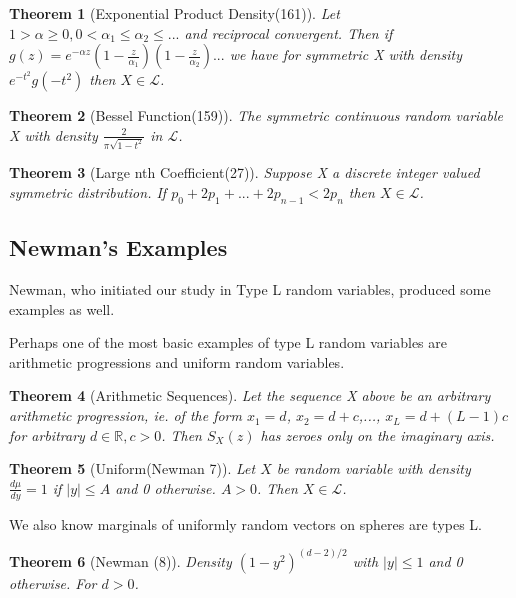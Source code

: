 \documentclass[10pt]{article}
\newcommand{\1}{\textbf{1}}
\newcommand{\R}{\mathbb{R}}
\newcommand{\lL}{\mathcal{L}}
\newtheorem{theorem}{Theorem}
\theoremstyle{remark}
\theoremstyle{definition}
\begin{document}
\begin{theorem}[Exponential Product Density(161)] \label{EXPPDEN}
	Let $1 > \alpha \geq 0, 0 < \alpha_1 \leq \alpha_2 \leq ...$ and reciprocal convergent. Then if $g(z)= e^{-\alpha z} (1-\frac{z}{\alpha_1})(1-\frac{z}{\alpha_2})...$ we have for symmetric X with density $e^{-t^2} g(-t^2)$ then $X \in \lL$.
\end{theorem}

\begin{theorem}[Bessel Function(159)] \label{BF}
	The symmetric continuous random variable X with density $\frac{2}{\pi\sqrt{1-t^2}}$ in $\lL$.
\end{theorem} 

\begin{theorem}[Large nth Coefficient(27)] \label{LNC}
	Suppose X a discrete integer valued symmetric distribution. If $p_0 + 2p_1 +... + 2p_{n-1} < 2p_n$ then $X \in \lL$. 
\end{theorem}


\subsection{Newman's Examples}

Newman, who initiated our study in Type L random variables, produced some examples as well. 

Perhaps one of the most basic examples of type L random variables are arithmetic progressions and uniform random variables.

\begin{theorem}[Arithmetic Sequences] \label{them:AS}
	Let the sequence X above be an arbitrary arithmetic progression, ie. of the form $x_1 = d$, $x_2 = d+c$,..., $x_L = d + (L-1)c$ for arbitrary $d \in \R, c > 0$. Then $S_X(z)$ has zeroes only on the imaginary axis.
\end{theorem}

\begin{theorem}[Uniform(Newman 7)] \label{UNI}
	Let $X$ be random variable with density $\frac{d\mu}{dy} = 1$ if $|y| \leq A$ and 0 otherwise. $A > 0$. Then $X \in \lL$.
\end{theorem}

We also know marginals of uniformly random vectors on spheres are types L.

\begin{theorem}[Newman (8)] \label{N8}
	Density $(1-y^2)^{(d-2)/2}$ with $|y| \leq 1$ and 0 otherwise. For $d > 0$. 
\end{theorem}
\end{document}
